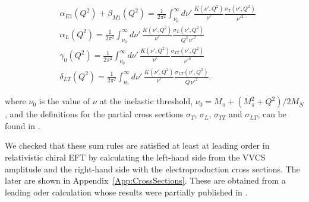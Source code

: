 \documentclass[prc,twocolumn,showpacs,preprintnumbers,amsmath,amssymb
,superscriptaddress,a4paper,nofootinbib
]{revtex4-1}
\begin{document}
\begin{align}
&\alpha_{E1}(Q^2)+\beta_{M1} (Q^2)= \frac{1}{2 \pi^2} \int_{\nu_0}^\infty \!\!\!\! d\nu'\,\frac{K(\nu',Q^2)}{\nu'} \frac{\sigma_T (\nu',Q^2)}{\nu'^2} \label{Eq:alpha+betaQ2}\\
&\alpha_L (Q^2)= \frac{1}{2 \pi^2} \int_{\nu_0}^\infty\!\!\!\! d\nu'\, \frac{K(\nu',Q^2)}{\nu'}                                                                                                                                                                                                                                                                                                                                                                                                 \frac{\sigma_L (\nu',Q^2)}{Q^2\, \nu'^2} \label{Eq:alphaLQ2}\\
&\gamma_0 (Q^2)= \frac{1}{2 \pi^2} \int_{\nu_0}^\infty \!\!\!\! d\nu'\,\frac{K(\nu',Q^2)}{\nu'} \frac{\sigma_{TT} (\nu',Q^2)}{\nu'^3} \label{Eq:gamma0Q2}\\
&\delta_{LT} (Q^2)= \frac{1}{2 \pi^2} \int_{\nu_0}^\infty \!\!\!\! d\nu'\,\frac{K(\nu',Q^2)}{\nu'} \frac{\sigma_{LT} (\nu',Q^2)}{Q\,\nu'^2}. \label{Eq:deltaLTQ2} 
\end{align}

where $\nu_0$ is the value of $\nu$ at the inelastic threshold, $\nu_0=M_\pi + (M_\pi^2+Q^2)/2M_N$, and the definitions for the partial cross sections $\sigma_T$, $\sigma_L$, $\sigma_{TT}$ and $\sigma_{LT}$, can be found in \cite{Drechsel:2002ar,Drechsel:1992pn}. 

We checked that these sum rules are satisfied at least at leading order in relativistic chiral EFT by calculating the left-hand side from the VVCS amplitude and the right-hand side with the electroproduction cross sections. 
The later are shown in Appendix~\ref{App:CrossSections}. 
These are obtained from a leading oder calculation whose results were partially published in \cite{Alarcon:2013cba}.
\end{document}
